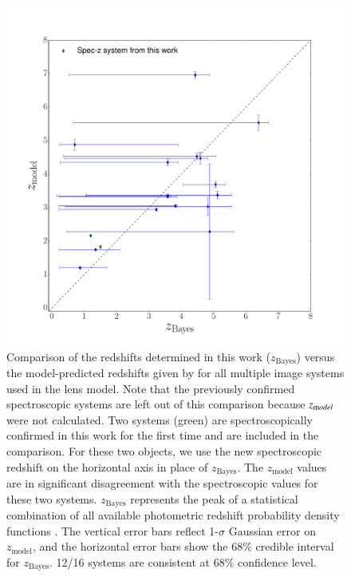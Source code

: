 \begin{figure}
    \centering
    \includegraphics[width=\textwidth]{fig/redshift_comparison.pdf}
    \caption[Comparison of the redshifts estimates.]{Comparison of the redshifts determined in this work
    ($z_{\textrm{Bayes}}$) versus the model-predicted redshifts given by \citet{2014arXiv1409.8663J} for all
    multiple image systems used in the lens model. Note that the previously confirmed spectroscopic systems are
    left out of this comparison because $z_{\textrm model}$ were not calculated. Two systems (green) are
    spectroscopically confirmed in this work for the first time and are included in the comparison. For these two
    objects, we use the new spectroscopic redshift on the horizontal axis in place of $z_{\textrm{Bayes}}$. The
    $z_{\textrm{model}}$ values are in significant disagreement with the spectroscopic values for these two
    systems. $z_{\textrm{Bayes}}$ represents the peak of a statistical combination of all available photometric
    redshift probability density functions \citep{Dahlen:2013p33380}. The vertical error bars reflect 1-$\sigma$
    Gaussian error on $z_{\textrm{model}}$, and the horizontal error bars show the $68\%$ credible interval for
    $z_{\textrm{Bayes}}$. 12/16 systems are consistent at $68\%$ confidence level. }
    \label{fig:compare_z}
\end{figure}


